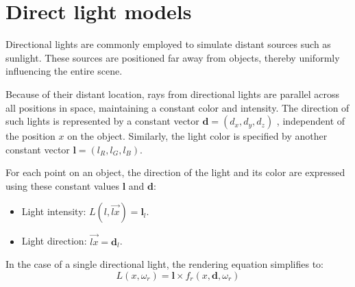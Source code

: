 \section{Direct light models}

Directional lights are commonly employed to simulate distant sources such as sunlight. 
These sources are positioned far away from objects, thereby uniformly influencing the entire scene.

Because of their distant location, rays from directional lights are parallel across all positions in space, maintaining a constant color and intensity.
The direction of such lights is represented by a constant vector $\mathbf{d}=(d_{x},d_{y},d_{z})$ , independent of the position $x$ on the object.
Similarly, the light color is specified by another constant vector $\mathbf{l}=(l_{R},l_{G},l_{B})$. 

For each point on an object, the direction of the light and its color are expressed using these constant values $\mathbf{l}$ and $\mathbf{d}$: 
\begin{itemize}
    \item Light intensity: $L(l,\overrightarrow{lx})=\mathbf{l}_l$. 
    \item Light direction: $\overrightarrow{lx}=\mathbf{d}_l$.
\end{itemize}
In the case of a single directional light, the rendering equation simplifies to:
\[L(x,\omega_r)=\mathbf{l}\times f_r(x,\mathbf{d},\omega_r)\]